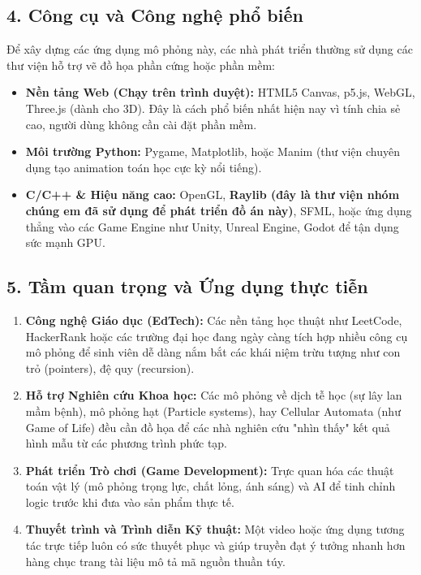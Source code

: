 \documentclass[12pt,a4paper,oneside]{report}
\begin{document}
\subsection*{4. Công cụ và Công nghệ phổ biến}
Để xây dựng các ứng dụng mô phỏng này, các nhà phát triển thường sử dụng các thư viện hỗ trợ vẽ đồ họa phần cứng hoặc phần mềm:

\begin{itemize}
    \item \textbf{Nền tảng Web (Chạy trên trình duyệt):} HTML5 Canvas, p5.js, WebGL, Three.js (dành cho 3D). Đây là cách phổ biến nhất hiện nay vì tính chia sẻ cao, người dùng không cần cài đặt phần mềm.
    \item \textbf{Môi trường Python:} Pygame, Matplotlib, hoặc Manim (thư viện chuyên dụng tạo animation toán học cực kỳ nổi tiếng).
    \item \textbf{C/C++ \& Hiệu năng cao:} OpenGL, \textbf{Raylib (đây là thư viện nhóm chúng em đã sử dụng để phát triển đồ án này)}, SFML, hoặc ứng dụng thẳng vào các Game Engine như Unity, Unreal Engine, Godot để tận dụng sức mạnh GPU.
\end{itemize}

\subsection*{5. Tầm quan trọng và Ứng dụng thực tiễn}
\begin{enumerate}
    \item \textbf{Công nghệ Giáo dục (EdTech):} Các nền tảng học thuật như LeetCode, HackerRank hoặc các trường đại học đang ngày càng tích hợp nhiều công cụ mô phỏng để sinh viên dễ dàng nắm bắt các khái niệm trừu tượng như con trỏ (pointers), đệ quy (recursion).
    \item \textbf{Hỗ trợ Nghiên cứu Khoa học:} Các mô phỏng về dịch tễ học (sự lây lan mầm bệnh), mô phỏng hạt (Particle systems), hay Cellular Automata (như Game of Life) đều cần đồ họa để các nhà nghiên cứu "nhìn thấy" kết quả hình mẫu từ các phương trình phức tạp.
    \item \textbf{Phát triển Trò chơi (Game Development):} Trực quan hóa các thuật toán vật lý (mô phỏng trọng lực, chất lỏng, ánh sáng) và AI để tinh chỉnh logic trước khi đưa vào sản phẩm thực tế.
    \item \textbf{Thuyết trình và Trình diễn Kỹ thuật:} Một video hoặc ứng dụng tương tác trực tiếp luôn có sức thuyết phục và giúp truyền đạt ý tưởng nhanh hơn hàng chục trang tài liệu mô tả mã nguồn thuần túy.
\end{enumerate}
\end{document}
